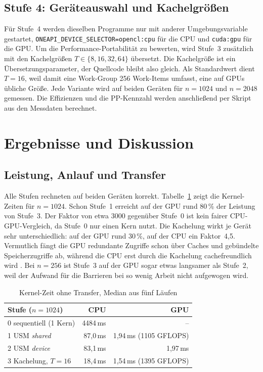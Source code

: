 \documentclass[12pt,a4paper]{article}
\begin{document}
\subsection{Stufe 4: Geräteauswahl und Kachelgrößen}

Für Stufe~4 werden dieselben Programme nur mit anderer Umgebungsvariable
gestartet, \texttt{ONEAPI\_DEVICE\_SELECTOR=opencl:cpu} für die CPU und
\texttt{cuda:gpu} für die GPU. Um die Performance-Portabilität zu bewerten,
wird Stufe~3 zusätzlich mit den Kachelgrößen $T \in \{8, 16, 32, 64\}$
übersetzt. Die Kachelgröße ist ein Übersetzungsparameter, der Quellcode
bleibt also gleich. Als Standardwert dient $T = 16$, weil damit eine
Work-Group 256 Work-Items umfasst, eine auf GPUs übliche Größe. Jede Variante wird auf beiden Geräten für $n = 1024$ und
$n = 2048$ gemessen. Die Effizienzen und die PP-Kennzahl werden
anschließend per Skript aus den Messdaten berechnet.

\section{Ergebnisse und Diskussion}\label{sec:ergebnisse}

\subsection{Leistung, Anlauf und Transfer}

Alle Stufen rechneten auf beiden Geräten korrekt. Tabelle~\ref{tab:leistung}
zeigt die Kernel-Zeiten für $n = 1024$. Schon Stufe~1 erreicht auf der GPU
rund 80\,\% der Leistung von Stufe~3. Der Faktor von etwa 3000 gegenüber
Stufe~0 ist kein fairer CPU-GPU-Vergleich, da Stufe~0 nur einen Kern nutzt.
Die Kachelung wirkt je Gerät sehr unterschiedlich: auf der GPU rund 30\,\%,
auf der CPU ein Faktor~4,5. Vermutlich fängt die GPU redundante Zugriffe
schon über Caches und gebündelte Speicherzugriffe ab, während die CPU erst
durch die Kachelung cachefreundlich wird \cite{hwu2022pmpp}. Bei
$n = 256$ ist Stufe~3 auf der GPU sogar etwas langsamer als Stufe~2, weil der
Aufwand für die Barrieren bei so wenig Arbeit nicht aufgewogen wird. 

\begin{table}[htbp]
\centering
\small
\begin{tabular}{@{}lrr@{}}
\toprule
\textbf{Stufe ($n = 1024$)} & \textbf{CPU} & \textbf{GPU} \\
\midrule
0 sequentiell (1 Kern) & 4484\,ms & -- \\
1 USM \emph{shared}    & 87{,}0\,ms & 1{,}94\,ms (1105 GFLOPS) \\
2 USM \emph{device}    & 83{,}1\,ms & 1{,}97\,ms \\
3 Kachelung, $T = 16$  & 18{,}4\,ms & 1{,}54\,ms (1395 GFLOPS) \\
\bottomrule
\end{tabular}
\caption{Kernel-Zeit ohne Transfer, Median aus fünf Läufen}
\label{tab:leistung}
\end{table}
\end{document}
